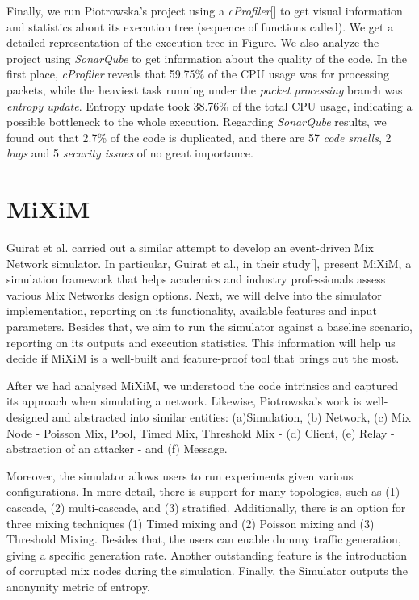 \documentclass[logo,msc,cyber]{infthesis}   %
\begin{document}
Finally, we run Piotrowska's project using a \emph{cProfiler}[] to get visual
information and statistics about its execution tree (sequence of functions
called). We get a detailed representation of the execution tree in Figure. We
also analyze the project using \emph{SonarQube} to get information about the
quality of the code. In the first place, \emph{cProfiler} reveals that 59.75\%
of the CPU usage was for processing packets, while the heaviest task running
under the \emph{packet processing} branch was \emph{entropy update}. Entropy
update took 38.76\% of the total CPU usage, indicating a possible bottleneck to
the whole execution. Regarding \emph{SonarQube} results, we found out that 2.7\%
of the code is duplicated, and there are 57 \emph{code smells}, 2 \emph{bugs}
and 5 \emph{security issues} of no great importance.

\section{MiXiM}

Guirat et al. carried out a similar attempt to develop an event-driven Mix
Network simulator. In particular, Guirat et al., in their study[], present
MiXiM, a simulation framework that helps academics and industry professionals
assess various Mix Networks design options. Next, we will delve into the
simulator implementation, reporting on its functionality, available features and
input parameters. Besides that, we aim to run the simulator against a baseline
scenario, reporting on its outputs and execution statistics. This information
will help us decide if MiXiM is a well-built and feature-proof tool that brings
out the most.

After we had analysed  MiXiM, we understood the code intrinsics and captured its
approach when simulating a network. Likewise, Piotrowska's work is well-designed
and abstracted into similar entities: (a)Simulation, (b) Network, (c) Mix Node -
Poisson Mix, Pool, Timed Mix, Threshold Mix - (d) Client, (e) Relay -
abstraction of an attacker - and (f) Message.


Moreover, the simulator allows users to run experiments given various
configurations. In more detail, there is support for many topologies, such as
(1) cascade, (2) multi-cascade, and (3) stratified. Additionally, there is an
option for three mixing techniques (1) Timed mixing and (2) Poisson mixing and
(3) Threshold Mixing. Besides that, the users can enable dummy traffic
generation, giving a specific generation rate. Another outstanding feature is
the introduction of corrupted mix nodes during the simulation. Finally, the
Simulator outputs the anonymity metric of entropy.
\end{document}
